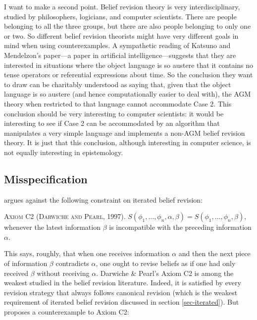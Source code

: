 I want to make a second point. Belief revision theory is very interdisciplinary, studied by philosophers, logicians, and computer scientists. There are people belonging to all the three groups, but there are also people belonging to only one or two. So different belief revision theorists might have very different goals in mind when using counterexamples. A sympathetic reading of Katsuno and Mendelzon's paper---a paper in artificial intelligence---suggests that they are interested in situations where the object language is so austere that it contains no tense operators or referential expressions about time. So the conclusion they want to draw can be charitably understood as saying that, given that the object language is so austere (and hence computationally easier to deal with), the AGM theory when restricted to that language cannot accommodate Case 2.  This conclusion should be very interesting to computer scientists: it would be interesting to see if Case 2 can be accommodated by an algorithm that manipulates a very simple language and implements a non-AGM belief revision theory. It is just that this conclusion, although interesting in computer science, is not equally interesting in epistemology.


\subsection{Misspecification}\label{sec-misspecification}


\citet{stalnaker2009iterated} argues against the following constraint on iterated belief revision: \op

	\xm \textsc{Axiom C2 (Darwiche and Pearl, 1997).} $S(\phi_1, \ldots, \phi_n, \alpha, \beta) = S(\phi_1, \ldots, \phi_n, \beta)$, whenever the latest information $\beta$ is incompatible with the preceding information $\alpha$.

\ed This says, roughly, that when one receives information $\alpha$ and then the next piece of information $\beta$ contradicts $\alpha$, one ought to revise beliefs as if one had only received $\beta$ without receiving $\alpha$. Darwiche \& Pearl's Axiom C2 is among the weakest studied in the belief revision literature. Indeed, it is satisfied by every revision strategy that always follows canonical revision (which is the weakest requirement of iterated belief revision discussed in section \ref{sec-iterated}). But \citet{stalnaker2009iterated} proposes a counterexample to Axiom C2: \op

